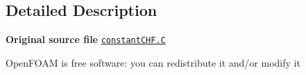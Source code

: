\subsection{Detailed Description}
{\bfseries Original source file} \href{../../../home/carlo/data/GeN-Foam/GeN-Foam_ffn/GeN-Foam/GeN-Foam/classes/thermalHydraulics/src/physicsModels/heatTransferModels/FSHeatTransferCoefficientModels/subModels/CHFModels/criticalHeatFluxModels/constantCHF/constantCHF.C}{\tt constant\+C\+H\+F.\+C}

Open\+F\+O\+AM is free software\+: you can redistribute it and/or modify it 